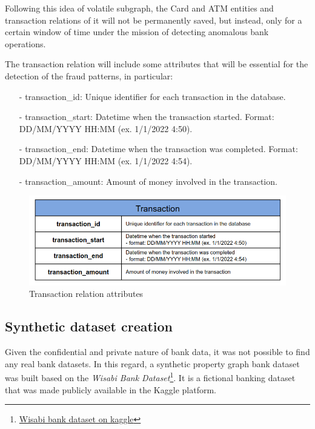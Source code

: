 \documentclass{article}
\begin{document}
Following this idea of volatile subgraph, the Card and ATM entities and transaction relations of it will not be permanently saved, but instead, only for a certain window of time under the mission of detecting anomalous bank operations. 

The transaction relation will include some attributes that will be essential for the detection of the fraud patterns, in particular:

\begin{itemize}
\item[-] transaction\_id: Unique identifier for each transaction in the database.
\item[-] transaction\_start: Datetime when the transaction started. Format: DD/MM/YYYY HH:MM (ex. 1/1/2022 4:50).
\item[-] transaction\_end: Datetime when the transaction was completed. Format: DD/MM/YYYY HH:MM (ex. 1/1/2022 4:54).
\item[-] transaction\_amount: Amount of money involved in the transaction.
\end{itemize}

\begin{figure}[H]
    \centering
    \includegraphics[scale = 0.40]{images/transaction.png}
    \caption{Transaction relation attributes}
    \label{img:pg-stable}
\end{figure}

\subsection{Synthetic dataset creation}

Given the confidential and private nature of bank data, it was not possible to find
any real bank datasets. In this regard, a synthetic property
graph bank dataset was built based on the \emph{Wisabi Bank Dataset}\footnote{\href{https://www.kaggle.com/datasets/obinnaiheanachor/wisabi-bank-dataset}{Wisabi bank dataset on kaggle}}. It is a fictional banking dataset that was made publicly available in
the Kaggle platform.
\end{document}
